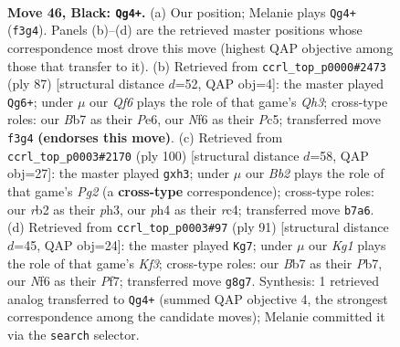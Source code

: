 \documentclass[11pt]{article}
\begin{document}
\clearpage

\begin{figure}[p]\centering
\begin{subfigure}{0.46\textwidth}\centering
\resizebox{\linewidth}{!}{%
\newchessgame
\chessboard[
  setfen={6k1/1b3p2/5np1/8/7P/5q2/1RR4P/5NK1 b - - 0 46},
  showmover=false,
  pgfstyle=straightmove, color=movearrow, markmove={f3-g4}
]}
\caption{}
\end{subfigure}\hfill
\begin{subfigure}{0.46\textwidth}\centering
\resizebox{\linewidth}{!}{%
\newchessgame
\chessboard[
  setfen={8/6k1/1p2p2q/2p5/P1P3K1/R5P1/7P/4R3 b - - 1 44},
  showmover=false,
  pgfstyle=straightmove, color=movearrow, markmove={h6-g6}
]}
\caption{}
\end{subfigure}
\\[4pt]
\begin{subfigure}{0.46\textwidth}\centering
\resizebox{\linewidth}{!}{%
\newchessgame
\chessboard[
  setfen={8/6rk/1B1P4/4Pp2/2r4p/6np/6P1/4Q1K1 w - - 0 51},
  showmover=false,
  pgfstyle=straightmove, color=movearrow, markmove={g2-h3}
]}
\caption{}
\end{subfigure}\hfill
\begin{subfigure}{0.46\textwidth}\centering
\resizebox{\linewidth}{!}{%
\newchessgame
\chessboard[
  setfen={8/1p3p2/5k2/1R6/4q1pP/8/5P1P/1R4K1 b - - 2 46},
  showmover=false,
  pgfstyle=straightmove, color=movearrow, markmove={f6-g7}
]}
\caption{}
\end{subfigure}
\caption{\textbf{Move 46, Black: \texttt{Qg4+}.} (a) Our position; Melanie plays \texttt{Qg4+} (\texttt{f3g4}). Panels (b)--(d) are the retrieved master positions whose correspondence most drove this move (highest QAP objective among those that transfer to it). (b) Retrieved from \texttt{ccrl\_top\_p0000\#2473} (ply 87) [structural distance $d$=52, QAP obj=4]: the master played \texttt{Qg6+}; under $\mu$ our \emph{Qf6} plays the role of that game's \emph{Qh3}; cross-type roles: our \emph{B}b7 as their \emph{P}e6, our \emph{N}f6 as their \emph{P}c5; transferred move \texttt{f3g4} \textbf{(endorses this move)}. (c) Retrieved from \texttt{ccrl\_top\_p0003\#2170} (ply 100) [structural distance $d$=58, QAP obj=27]: the master played \texttt{gxh3}; under $\mu$ our \emph{Bb2} plays the role of that game's \emph{Pg2} (a \textbf{cross-type} correspondence); cross-type roles: our \emph{r}b2 as their \emph{p}h3, our \emph{p}h4 as their \emph{r}c4; transferred move \texttt{b7a6}. (d) Retrieved from \texttt{ccrl\_top\_p0003\#97} (ply 91) [structural distance $d$=45, QAP obj=24]: the master played \texttt{Kg7}; under $\mu$ our \emph{Kg1} plays the role of that game's \emph{Kf3}; cross-type roles: our \emph{B}b7 as their \emph{P}b7, our \emph{N}f6 as their \emph{P}f7; transferred move \texttt{g8g7}. Synthesis: 1 retrieved analog transferred to \texttt{Qg4+} (summed QAP objective 4, the strongest correspondence among the candidate moves); Melanie committed it via the \texttt{search} selector.}
\label{fig:thought-m91}
\end{figure}
\end{document}
